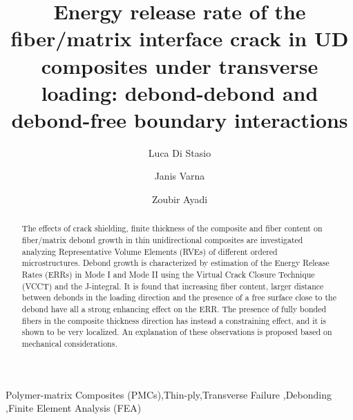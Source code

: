 \documentclass[review]{elsarticle}
\begin{document}
\begin{frontmatter}

\title{Energy release rate of the fiber/matrix interface crack in UD composites under transverse loading: debond-debond and debond-free boundary interactions}


\author[nancy,lulea]{Luca Di Stasio}
\author[lulea]{Janis Varna}
\author[nancy]{Zoubir Ayadi}


\address[nancy]{Universit\'e de Lorraine, EEIGM, IJL, 6 Rue Bastien Lepage, F-54010 Nancy, France}
\address[lulea]{Lule\aa\ University of Technology, University Campus, SE-97187 Lule\aa, Sweden}

\begin{abstract}
\noindent
The effects of crack shielding, finite thickness of the composite and fiber content on fiber/matrix debond growth in thin unidirectional composites are investigated analyzing  Representative Volume Elements (RVEs) of different ordered microstructures. Debond growth is characterized by estimation of the Energy Release Rates (ERRs) in Mode I and Mode II using the Virtual Crack Closure Technique (VCCT) and the J-integral. It is found that increasing fiber content, larger distance between debonds in the loading direction and the presence of a free surface close to the debond have all a strong enhancing effect on the ERR. The presence of fully bonded fibers in the composite thickness direction has instead a constraining effect, and it is shown to be very localized. An explanation of these observations is proposed based on mechanical considerations.
\end{abstract}

\begin{keyword}
Polymer-matrix Composites (PMCs)\sep Thin-ply\sep Transverse Failure \sep Debonding \sep Finite Element Analysis (FEA)
\end{keyword}

\end{frontmatter}
\end{document}
